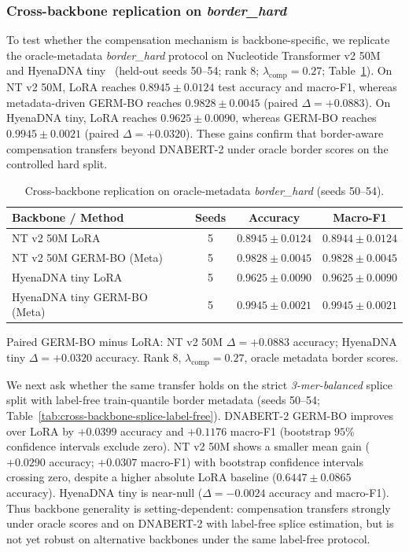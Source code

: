 \documentclass[12pt,letterpaper]{article}
\newcommand{\splitname}[1]{\textit{#1}}
\begin{document}
\subsubsection*{Cross-backbone replication on \splitname{border\_hard}}

To test whether the compensation mechanism is backbone-specific, we replicate the oracle-metadata \splitname{border\_hard} protocol on Nucleotide Transformer v2 50M~\cite{nucleotidetransformer2024} and HyenaDNA tiny~\cite{hyenadna2024} (held-out seeds 50--54; rank 8; $\lambda_{\mathrm{comp}}=0.27$; Table~\ref{tab:cross-backbone-oracle}). On NT v2 50M, LoRA reaches $0.8945 \pm 0.0124$ test accuracy and macro-F1, whereas metadata-driven GERM-BO reaches $0.9828 \pm 0.0045$ (paired $\Delta=+0.0883$). On HyenaDNA tiny, LoRA reaches $0.9625 \pm 0.0090$, whereas GERM-BO reaches $0.9945 \pm 0.0021$ (paired $\Delta=+0.0320$). These gains confirm that border-aware compensation transfers beyond DNABERT-2 under oracle border scores on the controlled hard split.

\begin{table}[!htb]
\centering
\caption{Cross-backbone replication on oracle-metadata \splitname{border\_hard} (seeds 50--54).}
\label{tab:cross-backbone-oracle}
\small
\begin{tabular}{lccc}
\toprule
Backbone / Method & Seeds & Accuracy & Macro-F1 \\
\midrule
NT v2 50M LoRA & 5 & $0.8945 \pm 0.0124$ & $0.8944 \pm 0.0124$ \\
NT v2 50M GERM-BO (Meta) & 5 & $\mathbf{0.9828 \pm 0.0045}$ & $\mathbf{0.9828 \pm 0.0045}$ \\
HyenaDNA tiny LoRA & 5 & $0.9625 \pm 0.0090$ & $0.9625 \pm 0.0090$ \\
HyenaDNA tiny GERM-BO (Meta) & 5 & $\mathbf{0.9945 \pm 0.0021}$ & $\mathbf{0.9945 \pm 0.0021}$ \\
\bottomrule
\end{tabular}

Paired GERM-BO minus LoRA: NT v2 50M $\Delta=+0.0883$ accuracy; HyenaDNA tiny $\Delta=+0.0320$ accuracy. Rank 8, $\lambda_{\mathrm{comp}}=0.27$, oracle metadata border scores.
\end{table}

We next ask whether the same transfer holds on the strict \splitname{3-mer-balanced} splice split with label-free train-quantile border metadata (seeds 50--54; Table~\ref{tab:cross-backbone-splice-label-free}). DNABERT-2 GERM-BO improves over LoRA by $+0.0399$ accuracy and $+0.1176$ macro-F1 (bootstrap $95\%$ confidence intervals exclude zero). NT v2 50M shows a smaller mean gain ($+0.0290$ accuracy; $+0.0307$ macro-F1) with bootstrap confidence intervals crossing zero, despite a higher absolute LoRA baseline ($0.6447 \pm 0.0865$ accuracy). HyenaDNA tiny is near-null ($\Delta=-0.0024$ accuracy and macro-F1). Thus backbone generality is setting-dependent: compensation transfers strongly under oracle scores and on DNABERT-2 with label-free splice estimation, but is not yet robust on alternative backbones under the same label-free protocol.
\end{document}
